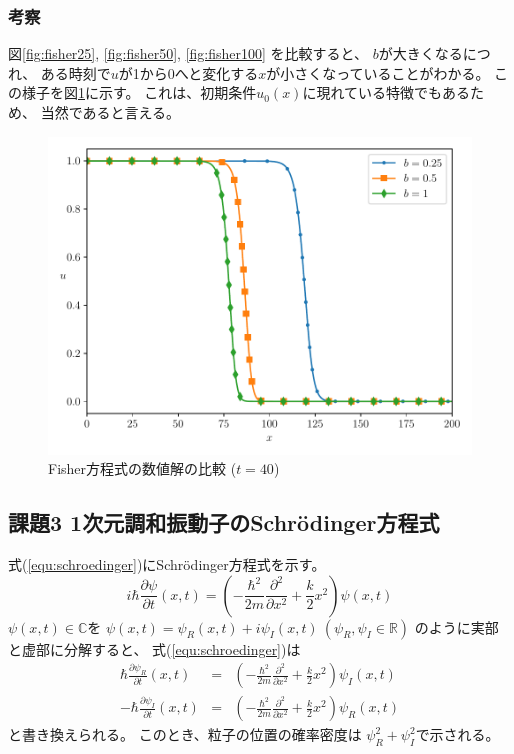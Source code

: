 \documentclass[a4j, titlepage]{jsarticle}
\numberwithin{equation}{section}
\begin{document}
        \subsubsection{考察}
            図\ref{fig:fisher25}, \ref{fig:fisher50}, \ref{fig:fisher100}
            を比較すると、
            $b$が大きくなるにつれ、
            ある時刻で$u$が1から0へと変化する$x$が小さくなっていることがわかる。
            この様子を図\ref{fig:fisher_compare}に示す。
            これは、初期条件$u_0(x)$に現れている特徴でもあるため、
            当然であると言える。
            \begin{figure}[h]
                \centering
                \includegraphics[width=0.8\hsize]{kadai2/compare.pdf}
                \caption{Fisher方程式の数値解の比較 ($t = 40$)}
                \label{fig:fisher_compare}
            \end{figure}

    \subsection{課題3 1次元調和振動子のSchr\"{o}dinger方程式}
        式(\ref{equ:schroedinger})にSchr\"{o}dinger方程式を示す。
        \begin{equation}
            i\hbar\frac{\partial\psi}{\partial t}(x, t) = \left(-\frac{\hbar^2}{2m}\frac{\partial^2}{\partial x^2} + \frac{k}{2}x^2\right)\psi(x, t) \label{equ:schroedinger}
        \end{equation}
        $\psi(x, t)\in\mathbb{C}$を
        $\psi(x, t) = \psi_R(x, t) + i\psi_I(x, t) \ (\psi_R, \psi_I\in\mathbb{R})$
        のように実部と虚部に分解すると、
        式(\ref{equ:schroedinger})は
        \begin{eqnarray*}
            \hbar\frac{\partial\psi_R}{\partial t}(x, t) &=& \left(-\frac{\hbar^2}{2m}\frac{\partial^2}{\partial x^2} + \frac{k}{2}x^2\right)\psi_I(x, t) \\
            -\hbar\frac{\partial\psi_I}{\partial t}(x, t) &=& \left(-\frac{\hbar^2}{2m}\frac{\partial^2}{\partial x^2} + \frac{k}{2}x^2\right)\psi_R(x, t)
        \end{eqnarray*}
        と書き換えられる。
        このとき、粒子の位置の確率密度は
        $\psi_R^2 + \psi_I^2$で示される。
\end{document}
